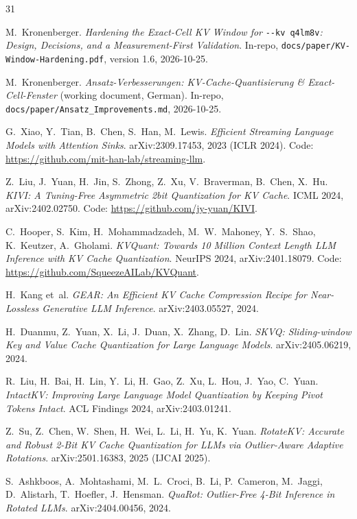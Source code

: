\documentclass[10pt,twocolumn]{article}
\begin{document}
\begin{thebibliography}{31}
\setlength{\itemsep}{0pt}\footnotesize\raggedright

M.~Kronenberger.
\emph{Hardening the Exact-Cell KV Window for} \texttt{-{}-kv q4lm8v}\emph{: Design, Decisions, and a Measurement-First Validation}.
In-repo, \texttt{docs/paper/KV-Window-Hardening.pdf}, version 1.6, 2026-10-25.

M.~Kronenberger.
\emph{Ansatz-Verbesserungen: KV-Cache-Quantisierung \& Exact-Cell-Fenster} (working document, German).
In-repo, \texttt{docs/paper/Ansatz\_Improvements.md}, 2026-10-25.

G.~Xiao, Y.~Tian, B.~Chen, S.~Han, M.~Lewis.
\emph{Efficient Streaming Language Models with Attention Sinks}.
arXiv:2309.17453, 2023 (ICLR 2024). Code: \url{https://github.com/mit-han-lab/streaming-llm}.

Z.~Liu, J.~Yuan, H.~Jin, S.~Zhong, Z.~Xu, V.~Braverman, B.~Chen, X.~Hu.
\emph{KIVI: A Tuning-Free Asymmetric 2bit Quantization for KV Cache}.
ICML 2024, arXiv:2402.02750. Code: \url{https://github.com/jy-yuan/KIVI}.

C.~Hooper, S.~Kim, H.~Mohammadzadeh, M.~W.~Mahoney, Y.~S.~Shao, K.~Keutzer, A.~Gholami.
\emph{KVQuant: Towards 10 Million Context Length LLM Inference with KV Cache Quantization}.
NeurIPS 2024, arXiv:2401.18079. Code: \url{https://github.com/SqueezeAILab/KVQuant}.

H.~Kang et~al.
\emph{GEAR: An Efficient KV Cache Compression Recipe for Near-Lossless Generative LLM Inference}.
arXiv:2403.05527, 2024.

H.~Duanmu, Z.~Yuan, X.~Li, J.~Duan, X.~Zhang, D.~Lin.
\emph{SKVQ: Sliding-window Key and Value Cache Quantization for Large Language Models}.
arXiv:2405.06219, 2024.

R.~Liu, H.~Bai, H.~Lin, Y.~Li, H.~Gao, Z.~Xu, L.~Hou, J.~Yao, C.~Yuan.
\emph{IntactKV: Improving Large Language Model Quantization by Keeping Pivot Tokens Intact}.
ACL Findings 2024, arXiv:2403.01241.

Z.~Su, Z.~Chen, W.~Shen, H.~Wei, L.~Li, H.~Yu, K.~Yuan.
\emph{RotateKV: Accurate and Robust 2-Bit KV Cache Quantization for LLMs via Outlier-Aware Adaptive Rotations}.
arXiv:2501.16383, 2025 (IJCAI 2025).

S.~Ashkboos, A.~Mohtashami, M.~L.~Croci, B.~Li, P.~Cameron, M.~Jaggi, D.~Alistarh, T.~Hoefler, J.~Hensman.
\emph{QuaRot: Outlier-Free 4-Bit Inference in Rotated LLMs}.
arXiv:2404.00456, 2024.


\end{thebibliography}
\end{document}
